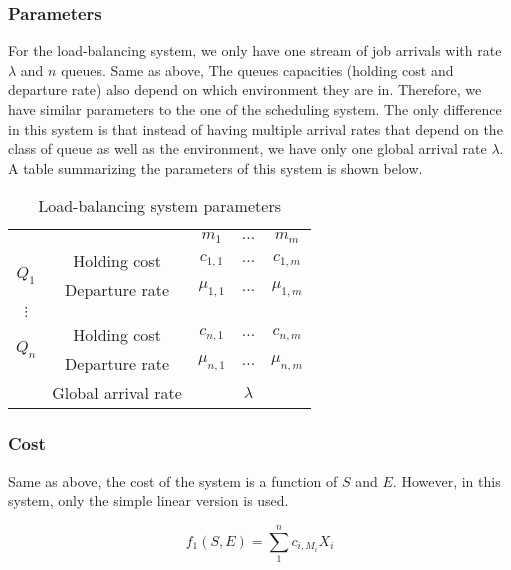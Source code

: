 \documentclass[
  a4paper, xcolor = usenames,dvipsnames]{article}
\theoremstyle{definition}
\theoremstyle{definition}
\theoremstyle{definition}
\theoremstyle{definition}
\theoremstyle{remark}
\begin{document}
\hypertarget{parameters-1}{%
\subsubsection{Parameters}\label{parameters-1}}

For the load-balancing system, we only have one stream of job arrivals with rate \(\lambda\) and \(n\) queues. Same as above, The queues capacities (holding cost and departure rate) also depend on which environment they are in. Therefore, we have similar parameters to the one of the scheduling system. The only difference in this system is that instead of having multiple arrival rates that depend on the class of queue as well as the environment, we have only one global arrival rate \(\lambda\). A table summarizing the parameters of this system is shown below.

\begin{table}[!htbp]
\caption{Load-balancing system parameters}
\begin{center}
\begin{tabular}{c c c c c}
    \hline
    \multicolumn{2}{c}{} & $m_{1}$ & $\dots$ & $m_{m}$ \\
    \cline{2-5}
    \multirow{2}{*}{$Q_{1}$} &  Holding cost & $c_{1, 1}$ & $\dots$ & $c_{1, m}$ \\
    & Departure rate & $\mu_{1, 1}$ & $\dots$ & $\mu_{1, m}$ \\
    \cline{2-5}
    $\vdots$  \\
    \cline{2-5}
    \multirow{2}{*}{$Q_{n}$} &  Holding cost & $c_{n, 1}$ & $\dots$ & $c_{n, m}$ \\
    & Departure rate & $\mu_{n, 1}$ & $\dots$ & $\mu_{n, m}$ \\
    \cline{2-5}
    & Global arrival rate & & $\lambda$ & \\
    \hline
\end{tabular}
\end{center}
\label{tab:lbs-param}
\end{table}

\hypertarget{cost-1}{%
\subsubsection{Cost}\label{cost-1}}

Same as above, the cost of the system is a function of \(S\) and \(E\). However, in this system, only the simple linear version is used.

\[
f_{1}(S, E) = \sum_{1}^{n} c_{i, M_{i}} X_{i}
\]
\end{document}
